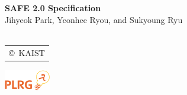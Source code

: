 \documentclass[oneside,openany,a4paper,10pt]{book}
\begin{document}
\begin{titlepage}
    \vspace*{15em}
    \centering
    {\bfseries\Huge
        SAFE 2.0 Specification\\
    }    
        \vskip2cm
       {\Large
 Jihyeok Park, Yeonhee Ryou, and Sukyoung Ryu}\\
~\\
\large
\begin{tabular}{c}
                        \copyright\ KAIST
\end{tabular}
\includegraphics[width=2cm]{plrg-logo.png}
\end{titlepage}

\tableofcontents

\newpage
\multibegin
\raggedcolumns







\normalsize



\multiend
\end{document}

